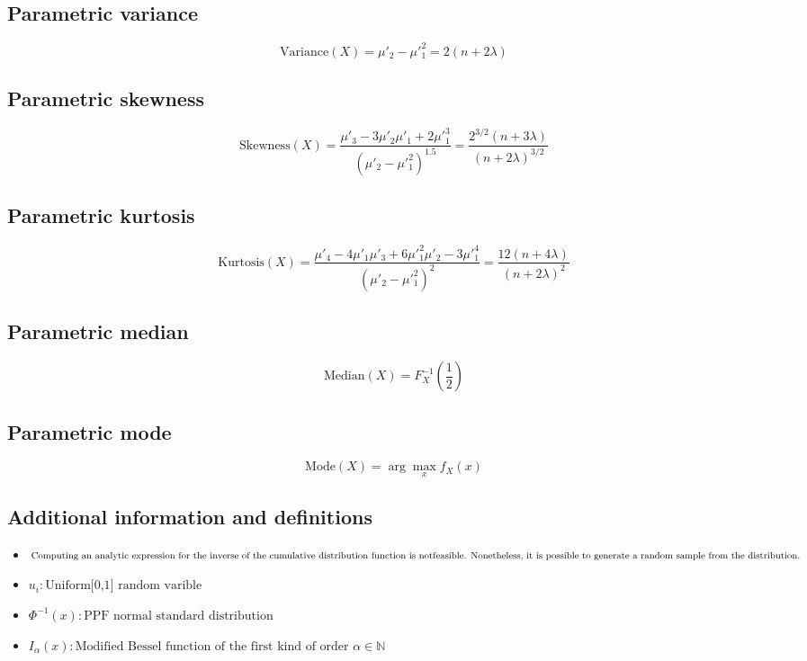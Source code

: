 \documentclass{article}
\begin{document}
\subsection{Parametric variance}
\begin{equation*} \mathrm{Variance}(X)=\mu'_{2}-\mu'^{2}_{1}=2(n+2\lambda) \end{equation*}
\subsection{Parametric skewness}
\begin{equation*} \mathrm{Skewness}(X)=\frac{\mu'_{3}-3\mu'_{2}\mu'_{1}+2\mu'^{3}_{1}}{(\mu'_{2}-\mu'^{2}_{1})^{1.5}}=\frac{2^{3/2}(n+3\lambda)}{(n+2\lambda)^{3/2}} \end{equation*}
\subsection{Parametric kurtosis}
\begin{equation*} \mathrm{Kurtosis}(X)=\frac{\mu'_{4}-4\mu'_{1}\mu'_{3}+6\mu'^{2}_{1}\mu'_{2}-3\mu'^{4}_{1}}{(\mu'_{2}-\mu'^{2}_{1})^{2}}=\frac{12(n+4\lambda)}{(n+2\lambda)^2} \end{equation*}
\subsection{Parametric median}
\begin{equation*} \mathrm{Median}(X)=F^{-1}_{X}\left(\frac{1}{2}\right) \end{equation*}
\subsection{Parametric mode}
\begin{equation*} \mathrm{Mode}(X)=\arg\max_{x}f_{X}\left(x\right) \end{equation*}
\subsection{Additional information and definitions}
\begin{itemize}
    \item $ \text{Computing an analytic expression for the inverse of the cumulative distribution function is not} \\ \text{feasible. Nonetheless, it is possible to generate a random sample from the distribution.} $
    \item $ u_{i}:\text{Uniform[0,1] random varible} $
    \item $ \Phi^{-1}\left(x\right):\text{PPF normal standard distribution} $
    \item $ I_{\alpha}\left(x\right):\text{Modified Bessel function of the first kind of order }\alpha\in\mathbb{N} $
\end{itemize}
\end{document}
